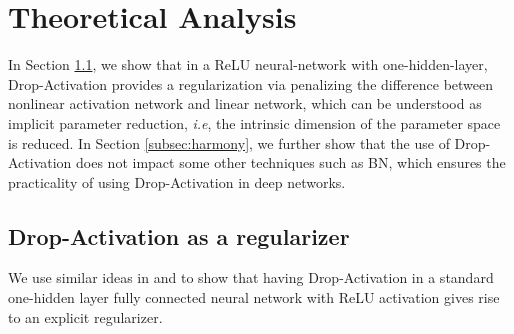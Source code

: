 \documentclass[11pt]{article}
\def\ie{\emph{i.e}}
\begin{document}
\section{Theoretical Analysis}
\label{sec:5}
In Section \ref{subsec:regularizer}, we show that in a ReLU neural-network with one-hidden-layer, Drop-Activation provides a regularization via penalizing the difference between nonlinear activation network and linear network, which can be understood as implicit parameter reduction, \ie, the intrinsic dimension of the parameter space is reduced. In Section \ref{subsec:harmony}, we further show that the use of Drop-Activation does not impact some other techniques such as BN, which ensures the practicality of using Drop-Activation in deep networks.

\subsection{Drop-Activation as a regularizer}
\label{subsec:regularizer}
We use similar ideas in \cite{dropout} and \cite{dropanalysis} to show that having Drop-Activation in a standard one-hidden layer fully connected neural network with ReLU activation gives rise to an explicit regularizer.
\end{document}
